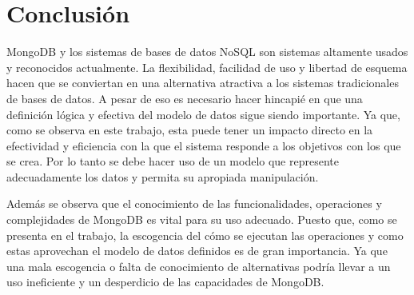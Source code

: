 \documentclass[conference,compsoc]{sty/IEEEtran}
\begin{document}

\section{Conclusión}
MongoDB y los sistemas de bases de datos NoSQL son sistemas altamente usados y reconocidos actualmente. La flexibilidad, facilidad de uso y libertad de esquema hacen que se conviertan en una alternativa atractiva a los sistemas tradicionales de bases de datos. A pesar de eso es necesario hacer hincapié en que una definición lógica y efectiva del modelo de datos sigue siendo importante. Ya que, como se observa en este trabajo, esta puede tener un impacto directo en la efectividad y eficiencia con la que el sistema responde a los objetivos con los que se crea. Por lo tanto se debe hacer uso de un modelo que represente adecuadamente los datos y permita su apropiada manipulación.

Además se observa que el conocimiento de las funcionalidades, operaciones y complejidades de MongoDB es vital para su uso adecuado. Puesto que, como se presenta en el trabajo, la escogencia del cómo se ejecutan las operaciones y como estas aprovechan el modelo de datos definidos es de gran importancia. Ya que una mala escogencia o falta de conocimiento de alternativas podría llevar a un uso ineficiente y un desperdicio de las capacidades de MongoDB.
\end{document}

